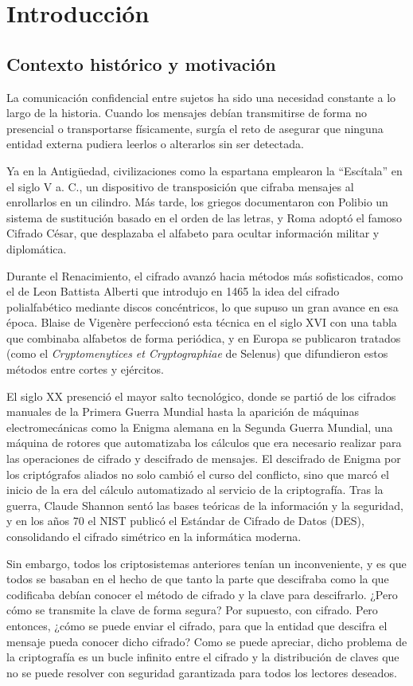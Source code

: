 \chapter{Introducción}

\section{Contexto histórico y motivación}
La comunicación confidencial entre sujetos ha sido una necesidad constante a lo largo de la historia. Cuando los mensajes debían transmitirse de forma no presencial o transportarse físicamente, surgía el reto de asegurar que ninguna entidad externa pudiera leerlos o alterarlos sin ser detectada.

Ya en la Antigüedad, civilizaciones como la espartana emplearon la “Escítala” en el siglo V a. C., un dispositivo de transposición que cifraba mensajes al enrollarlos en un cilindro. Más tarde, los griegos documentaron con Polibio un sistema de sustitución basado en el orden de las letras, y Roma adoptó el famoso Cifrado César, que desplazaba el alfabeto para ocultar información militar y diplomática.

Durante el Renacimiento, el cifrado avanzó hacia métodos más sofisticados, como el de Leon Battista Alberti que introdujo en 1465 la idea del cifrado polialfabético mediante discos concéntricos, lo que supuso un gran avance en esa época. Blaise de Vigenère perfeccionó esta técnica en el siglo XVI con una tabla que combinaba alfabetos de forma periódica, y en Europa se publicaron tratados (como el \emph{Cryptomenytices et Cryptographiae} de Selenus) que difundieron estos métodos entre cortes y ejércitos.

El siglo XX presenció el mayor salto tecnológico, donde se partió de los cifrados manuales de la Primera Guerra Mundial hasta la aparición de máquinas electromecánicas como la Enigma alemana en la Segunda Guerra Mundial, una máquina de rotores que automatizaba los cálculos que era necesario realizar para las operaciones de cifrado y descifrado de mensajes. El descifrado de Enigma por los criptógrafos aliados no solo cambió el curso del conflicto, sino que marcó el inicio de la era del cálculo automatizado al servicio de la criptografía. Tras la guerra, Claude Shannon sentó las bases teóricas de la información y la seguridad, y en los años 70 el NIST publicó el Estándar de Cifrado de Datos (DES), consolidando el cifrado simétrico en la informática moderna.

Sin embargo, todos los criptosistemas anteriores tenían un inconveniente, y es que todos se basaban en el hecho de que tanto la parte que descifraba como la que codificaba debían conocer el método de cifrado y la clave para descifrarlo. ¿Pero cómo se transmite la clave de forma segura? Por supuesto, con cifrado. Pero entonces, ¿cómo se puede enviar el cifrado, para que la entidad que descifra el mensaje pueda conocer dicho cifrado? Como se puede apreciar, dicho problema de la criptografía es un bucle infinito entre el cifrado y la distribución de claves que no se puede resolver con seguridad garantizada para todos los lectores deseados.

